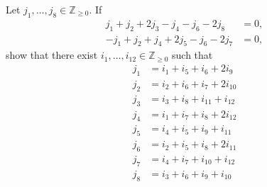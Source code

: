 \documentclass{amsart}
\title{}
\author{Declan Fletcher, 46982494}
\date{}
\begin{document}
\maketitle

Let $j_1, \ldots, j_8 \in \mathbb{Z}_{\ge 0}$.
If 
\begin{align*}
	j_1 + j_2 + 2 j_3 - j_4 - j_6 -2 j_8 &= 0, \\
	-j_1 + j_2 + j_4 + 2j_5 - j_6 -2 j_7 &=0,
\end{align*}
show that there exist $i_1, \ldots, i_{12} \in \mathbb{Z}_{\ge 0}$ such that 
\begin{align*}
	j_1 &= i_1 + i_5 + i_6 + 2 i_9 \\
	j_2 &= i_2 + i_6 + i_7 + 2 i_{10} \\
	j_3 &= i_3 + i_8 + i_{11} + i_{12} \\
	j_4 &= i_1 + i_7 + i_8 + 2 i_{12} \\
	j_5 &= i_4 + i_5 + i_9 + i_{11} \\
	j_6 &= i_2 + i_5 + i_8 + 2 i_{11} \\
	j_7 &= i_4 + i_7 + i_{10} + i_{12} \\
	j_8 &= i_3 + i_6 + i_9 + i_{10}
\end{align*}
\end{document}
